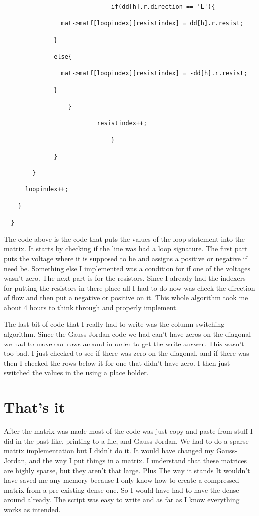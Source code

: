 \documentclass{article}
\begin{document}
\begin{lstlisting}
                              if(dd[h].r.direction == 'L'){

                mat->matf[loopindex][resistindex] = dd[h].r.resist;

              }

              else{

                mat->matf[loopindex][resistindex] = -dd[h].r.resist;

              }

                  }

                          resistindex++;

                              }

              }

        }

      loopindex++;

    }

  }

\end{lstlisting}

The code above is the code that puts the values of the loop statement into the matrix. It starts by checking if the line was had a loop signature. The first part puts the voltage where it is supposed to be and assigns a positive or negative if need be. Something else I implemented was a condition for if one of the voltages wasn't zero. The next part is for the resistors. Since I already had the indexers for putting the resistors in there place all I had to do now was check the direction of flow and then put a negative or positive on it. This whole algorithm took me about 4 hours to think through and properly implement.\newline

\indent The last bit of code that I really had to write was the column switching algorithm. Since the Gauss-Jordan code we had can't have zeros on the diagonal we had to move our rows around in order to get the write answer. This wasn't too bad. I just checked to see if there was zero on the diagonal, and if there was then I checked the rows below it for one that didn't have zero. I then just switched the values in the using a place holder.

\section*{That's it}

After the matrix was made most of the code was just copy and paste from stuff I did in the past like, printing to a file, and Gauss-Jordan. We had to do a sparse matrix implementation but I didn't do it. It would have changed my Gauss-Jordan, and the way I put things in a matrix. I understand that these matrices are highly sparse, but they aren't that large. Plus The way it stands It wouldn't have saved me any memory because I only know how to create a compressed matrix from a pre-existing dense one. So I would have had to have the dense around already. The script was easy to write and as far as I know everything works as intended.
\end{document}
